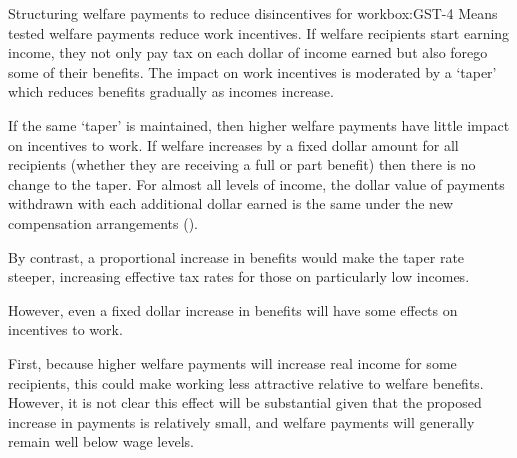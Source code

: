 \documentclass{grattanAlpha}
\begin{document}
\begin{bigboxC*}{Structuring welfare payments to reduce disincentives for work}{box:GST-4}
Means tested welfare payments reduce work incentives. If welfare recipients start earning income, they not only pay tax on each dollar of income earned but also forego some of their benefits. The impact on work incentives is moderated by a ‘taper’ which reduces benefits gradually as incomes increase.

If the same ‘taper’ is maintained, then higher welfare payments have little impact on incentives to work. If welfare increases by a fixed dollar amount for all recipients (whether they are receiving a full or part benefit) then there is no change to the taper. For almost all levels of income, the dollar value of payments withdrawn with each additional dollar earned is the same under the new compensation arrangements (). 

By contrast, a proportional increase in benefits would make the taper rate steeper, increasing effective tax rates for those on particularly low incomes.

However, even a fixed dollar increase in benefits will have some effects on incentives to work.  

First, because higher welfare payments will increase real income for some recipients, this could make working less attractive relative to welfare benefits. However, it is not clear this effect will be substantial given that the proposed increase in payments is relatively small, and welfare payments will generally remain well below wage levels. 


\end{bigboxC*}
\end{document}
